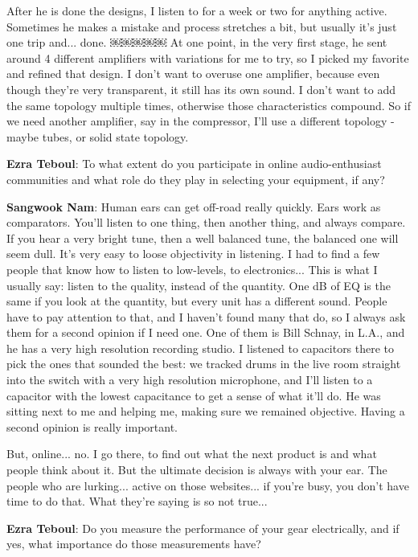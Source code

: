 After he is done the designs, I listen to for a week or two for anything active. Sometimes he makes a mistake and process stretches a bit, but usually it's just one trip and... done.
￼￼￼￼￼
At one point, in the very first stage, he sent around 4 different amplifiers with variations for me to try, so I picked my favorite and refined that design. I don't want to overuse one amplifier, because even though they're very transparent, it still has its own sound. I don't want to add the same topology multiple times, otherwise those characteristics compound. So if we need another amplifier, say in the compressor, I'll use a different topology - maybe tubes, or solid state topology.

\textbf{Ezra Teboul}: To what extent do you participate in online audio-enthusiast communities and what role do they play in selecting your equipment, if any?

\textbf{Sangwook Nam}: Human ears can get off-road really quickly. Ears work as comparators. You'll listen to one thing, then another thing, and always compare. If you hear a very bright tune, then a well balanced tune, the balanced one will seem dull. It's very easy to loose objectivity in listening. I had to find a few people that know how to listen to low-levels, to electronics... This is what I usually say: listen to the quality, instead of the quantity. One dB of EQ is the same if you look at the quantity, but every unit has a different sound. People have to pay attention to that, and I haven't found many that do, so I always ask them for a second opinion if I need one. One of them is Bill Schnay, in L.A., and he has a very high resolution recording studio. I listened to capacitors there to pick the ones that sounded the best: we tracked drums in the live room straight into the switch with a very high resolution microphone, and I'll listen to a capacitor with the lowest capacitance to get a sense of what it'll do. He was sitting next to me and helping me, making sure we remained objective. Having a second opinion is really important.

But, online... no. I go there, to find out what the next product is and what people think about it. But the ultimate decision is always with your ear. The people who are lurking... active on those websites... if you're busy, you don't have time to do that. What they're saying is so not true...

\textbf{Ezra Teboul}: Do you measure the performance of your gear electrically, and if yes, what importance do those measurements have?

